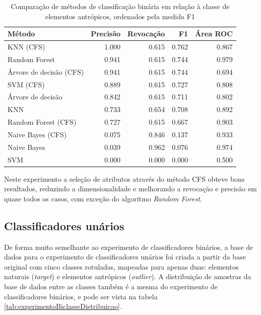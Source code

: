 \begin{table}[h]
\centering
\begin{tabulary}{\linewidth}{|L|R|R|R|R|}
\hline
\textbf{Método} & \textbf{Precisão} & \textbf{Revocação} & \textbf{F1} & \textbf{Área ROC} \\ \hline
KNN (CFS)               & 1.000 & 0.615 & 0.762 & 0.867 \\ \hline
Random Forest           & 0.941 & 0.615 & 0.744 & 0.979 \\ \hline
Árvore de decisão (CFS) & 0.941 & 0.615 & 0.744 & 0.694 \\ \hline
SVM (CFS)               & 0.889 & 0.615 & 0.727 & 0.808 \\ \hline
Árvore de decisão       & 0.842 & 0.615 & 0.711 & 0.802 \\ \hline
KNN                     & 0.733 & 0.654 & 0.708 & 0.892 \\ \hline
Random Forest (CFS)     & 0.727 & 0.615 & 0.667 & 0.903 \\ \hline
Naive Bayes (CFS)       & 0.075 & 0.846 & 0.137 & 0.933 \\ \hline
Naive Bayes             & 0.039 & 0.962 & 0.076 & 0.974 \\ \hline
SVM                     & 0.000 & 0.000 & 0.000 & 0.500 \\ \hline
\end{tabulary}
\caption{Comparação de métodos de classificação binária em relação à classe de elementos antrópicos, ordenados pela medida F1}
\label{tab:experimentoBiclasseAntropico}
\end{table}

Neste experimento a seleção de atributos através do método CFS obteve bons resultados, reduzindo a dimensionalidade e melhorando a revocação e precisão em quase todos os casos, com exceção do algoritmo \textit{Random Forest}.

\subsection{Classificadores unários}

De forma muito semelhante ao experimento de classificadores binários, a base de dados para o experimento de classificadores unários foi criada a partir da base original com cinco classes rotuladas, mapeadas para apenas duas: elementos naturais (\textit{target}) e elementos antrópicos (\textit{outlier}). A distribuição de amostras da base de dados entre as classes também é a mesma do experimento de classificadores binários, e pode ser vista na tabela \ref{tab:experimentoBiclasseDistribuicao}.

